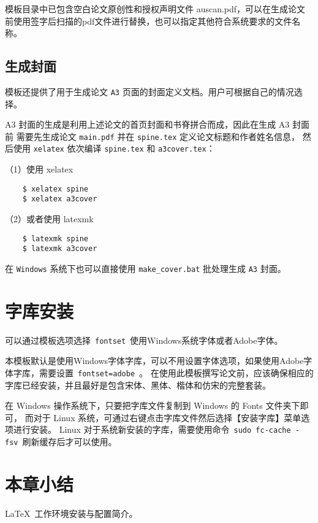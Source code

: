 模板目录中已包含空白论文原创性和授权声明文件 auscan.pdf，可以在生成论文前使用签字后扫描的pdf文件进行替换，也可以指定其他符合系统要求的文件名称。

\subsection{生成封面}
\label{sec:generate-cover}

模板还提供了用于生成论文 \texttt{A3} 页面的封面定义文档。用户可根据自己的情况选择。

A3 封面的生成是利用上述论文的首页封面和书脊拼合而成，因此在生成 A3 封面前
需要先生成论文 \texttt{main.pdf} 并在 \texttt{spine.tex} 定义论文标题和作者姓名信息，
然后使用 \texttt{xelatex} 依次编译 \texttt{spine.tex} 和 \texttt{a3cover.tex}：

（1）使用 xelatex

\begin{lstlisting}
    $ xelatex spine
    $ xelatex a3cover
\end{lstlisting}

（2）或者使用 latexmk

\begin{lstlisting}
    $ latexmk spine
    $ latexmk a3cover
\end{lstlisting}

在 \texttt{Windows} 系统下也可以直接使用 \texttt{make\_cover.bat} 批处理生成 \texttt{A3} 封面。

\section{字库安装}

可以通过模板选项选择~\texttt{fontset}~使用Windows系统字体或者Adobe字体。

本模板默认是使用Windows字体字库，可以不用设置字体选项，如果使用Adobe字体字库，需要设置~\texttt{fontset=adobe}~。
在使用此模板撰写论文前，应该确保相应的字库已经安装，并且最好是包含宋体、黑体、楷体和仿宋的完整套装。

在 Windows 操作系统下，只要把字库文件复制到 Windows 的 Fonts 文件夹下即可，
而对于 Linux 系统，可通过右键点击字库文件然后选择【安装字库】菜单选项进行安装。
Linux 对于系统新安装的字库，需要使用命令~\texttt{sudo fc-cache -fsv}~刷新缓存后才可以使用。

\section*{本章小结}
\LaTeX{}~工作环境安装与配置简介。
